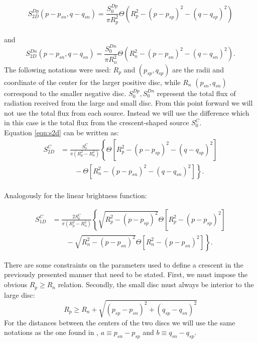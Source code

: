 \documentclass[usenatbib]{mn2e}
\begin{document}
\begin{equation}
 S_{2D}^{Dp}(p-p_{sn}, q-q_{sn}) = \frac{S_0^{Dp}}{\pi R_p^2} \Theta \left( R_p^2 - \left( p-p_{sp} \right)^2 - \left( q-q_{sp} \right)^2 \right)
\end{equation}
\\
and
\begin{equation}
 S_{2D}^{Dn}(p-p_{sn}, q-q_{sn}) = \frac{S_0^{Dn}}{\pi R_n^2} \Theta \left( R_n^2 - \left( p-p_{sn} \right)^2 - \left( q-q_{sn} \right)^2 \right).
\end{equation}
The following notations were used: $R_p$ and $(p_{sp}, q_{sp})$ are
the radii and coordinate of the center for the larger positive disc, 
while $R_n$ $(p_{sn},q_{sn})$ correspond to the smaller negative disc. 
$S_0^{Dp},S_0^{Dn}$ represent the total flux of radiation received from the large and small disc. 
From this point forward we will not use the total flux from each source. Instead we will 
use the difference which in this case is the total flux from the crescent-shaped source $S_0^C$. \\
Equation \ref{eqn:s2d} can be written as:\\

\begin{align}
 S_{2D}^C &= \frac{S_0^C}{\pi \left(R_p^2-R_n^2 \right)} \left\{ \Theta \left[ R_p^2 - \left( p-p_{sp} \right)^2 - \left( q-q_{sp} \right)^2 \right] \right.\nonumber\\
 &\qquad \left. {} -  \Theta \left[ R_n^2 - \left( p-p_{sn} \right)^2 - \left( q-q_{sn} \right)^2 \right] \right\}.
\end{align}
\\
Analogously for the linear brightness function:

\begin{align}
 S_{1D}^C &= \frac{2 S_0^C}{\pi \left(R_p^2-R_n^2 \right)} \left\{ \sqrt{R_p^2 - (p-p_{sp})^2}  \Theta \left[ R_p^2 - \left( p-p_{sp} \right)^2 \right] \right.\nonumber\\
 &\qquad \left. {} - \sqrt{R_n^2 - (p-p_{sn})^2 } \Theta \left[ R_n^2 - \left( p-p_{sn} \right)^2 \right] \right\}.
\label{eqn:s1_d}
\end{align}


There are some constraints on the parameters used to define a crescent
in the previously presented manner that need to be stated. First, we
must impose the obvious $R_p \geq R_n$ relation. Secondly, the small disc
must always be interior to the large disc:
\begin{equation}
 R_p \ge R_n + \sqrt{\left(p_{sp} - p_{sn} \right)^2 + \left(q_{sp} - q_{sn} \right)^2}
\end{equation}
For the distances between the centers of the two discs we will use the same 
notations as the one found in \cite{2013MNRAS.434..765K}, $a \equiv p_{sn} - p_{sp}$ and $b \equiv q_{sn} - q_{sp}$.
\end{document}
